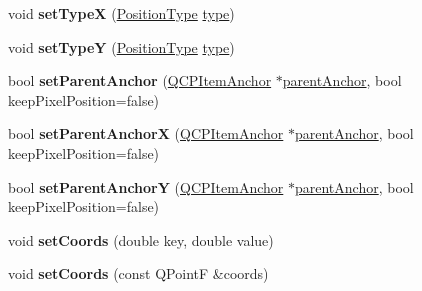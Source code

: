 \begin{DoxyCompactItemize}
\item 
void {\bfseries set\+TypeX} (\hyperlink{class_q_c_p_item_position_aad9936c22bf43e3d358552f6e86dbdc8}{Position\+Type} \hyperlink{class_q_c_p_item_position_aecb709d72c9aa334a7f62e2c9e0b5d60}{type})\hypertarget{class_q_c_p_item_position_a2113b2351d6d00457fb3559a4e20c3ea}{}\label{class_q_c_p_item_position_a2113b2351d6d00457fb3559a4e20c3ea}

\item 
void {\bfseries set\+TypeY} (\hyperlink{class_q_c_p_item_position_aad9936c22bf43e3d358552f6e86dbdc8}{Position\+Type} \hyperlink{class_q_c_p_item_position_aecb709d72c9aa334a7f62e2c9e0b5d60}{type})\hypertarget{class_q_c_p_item_position_ac2a454aa5a54c1615c50686601ec4510}{}\label{class_q_c_p_item_position_ac2a454aa5a54c1615c50686601ec4510}

\item 
bool {\bfseries set\+Parent\+Anchor} (\hyperlink{class_q_c_p_item_anchor}{Q\+C\+P\+Item\+Anchor} $\ast$\hyperlink{class_q_c_p_item_position_a7b4ffab9946945c0e11cd2352dc2e042}{parent\+Anchor}, bool keep\+Pixel\+Position=false)\hypertarget{class_q_c_p_item_position_ac094d67a95d2dceafa0d50b9db3a7e51}{}\label{class_q_c_p_item_position_ac094d67a95d2dceafa0d50b9db3a7e51}

\item 
bool {\bfseries set\+Parent\+AnchorX} (\hyperlink{class_q_c_p_item_anchor}{Q\+C\+P\+Item\+Anchor} $\ast$\hyperlink{class_q_c_p_item_position_a7b4ffab9946945c0e11cd2352dc2e042}{parent\+Anchor}, bool keep\+Pixel\+Position=false)\hypertarget{class_q_c_p_item_position_add71461a973927c74e42179480916d9c}{}\label{class_q_c_p_item_position_add71461a973927c74e42179480916d9c}

\item 
bool {\bfseries set\+Parent\+AnchorY} (\hyperlink{class_q_c_p_item_anchor}{Q\+C\+P\+Item\+Anchor} $\ast$\hyperlink{class_q_c_p_item_position_a7b4ffab9946945c0e11cd2352dc2e042}{parent\+Anchor}, bool keep\+Pixel\+Position=false)\hypertarget{class_q_c_p_item_position_add5ec1db9d19cec58a3b5c9e0a0c3f9d}{}\label{class_q_c_p_item_position_add5ec1db9d19cec58a3b5c9e0a0c3f9d}

\item 
void {\bfseries set\+Coords} (double key, double value)\hypertarget{class_q_c_p_item_position_aa988ba4e87ab684c9021017dcaba945f}{}\label{class_q_c_p_item_position_aa988ba4e87ab684c9021017dcaba945f}

\item 
void {\bfseries set\+Coords} (const Q\+PointF \&coords)\hypertarget{class_q_c_p_item_position_acc70b3abc143287f806e5f154e5e07b0}{}\label{class_q_c_p_item_position_acc70b3abc143287f806e5f154e5e07b0}


\end{DoxyCompactItemize}
